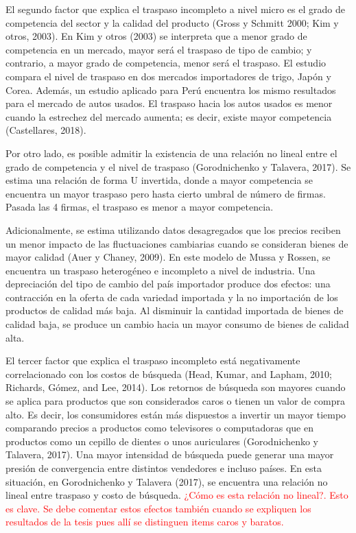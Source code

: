 \documentclass[12pt,a4paper,pdflatex]{article}
\begin{document}
El segundo factor que explica el traspaso incompleto a nivel micro es el grado de competencia del sector y la calidad del producto (Gross y Schmitt 2000; Kim y otros, 2003). En Kim y otros (2003) se interpreta que a menor grado de competencia en un mercado, mayor será el traspaso de tipo de cambio; y contrario, a mayor grado de competencia, menor será el traspaso. El estudio compara el nivel de traspaso en dos mercados importadores de trigo, Japón y Corea. Además, un estudio aplicado para Perú encuentra los mismo resultados para el mercado de autos usados. El traspaso hacia los autos usados es menor cuando la estrechez del mercado aumenta; es decir, existe mayor competencia (Castellares, 2018).

Por otro lado, es posible admitir la existencia de una relación no lineal entre el grado de competencia y el nivel de traspaso (Gorodnichenko y Talavera, 2017). Se estima una relación de forma U invertida, donde a mayor competencia se encuentra un mayor traspaso pero hasta cierto umbral de número de firmas. Pasada las 4 firmas, el traspaso es menor a mayor competencia.

Adicionalmente, se estima utilizando datos desagregados que los precios reciben un menor impacto de las fluctuaciones cambiarias cuando se consideran bienes de mayor calidad (Auer y Chaney, 2009). En este modelo de Mussa y Rossen, se encuentra un traspaso heterogéneo e incompleto a nivel de industria.  Una depreciación del tipo de cambio del país importador produce dos efectos: una contracción en la oferta de cada variedad importada y la no importación de los productos de calidad más baja. Al disminuir la cantidad importada de bienes de calidad baja, se produce un cambio hacia un mayor consumo de bienes de calidad alta.

El tercer factor que explica el traspaso incompleto está negativamente correlacionado con los costos de búsqueda (Head, Kumar, and Lapham, 2010; Richards, Gómez, and Lee, 2014). Los retornos de búsqueda son mayores cuando se aplica para productos que son considerados caros o tienen un valor de compra alto. Es decir, los consumidores están más dispuestos a invertir un mayor tiempo comparando precios a productos como televisores o computadoras que en productos como un cepillo de dientes o unos auriculares (Gorodnichenko y Talavera, 2017). Una mayor intensidad de búsqueda puede generar una mayor presión de convergencia entre distintos vendedores e incluso países. En esta situación, en Gorodnichenko y Talavera (2017), se encuentra una relación no lineal entre traspaso y costo de búsqueda. \textcolor{red}{¿Cómo es esta relación no lineal?. Esto es clave. Se debe comentar estos efectos también cuando se expliquen los resultados de la tesis pues allí se distinguen items caros y baratos.}
\end{document}
